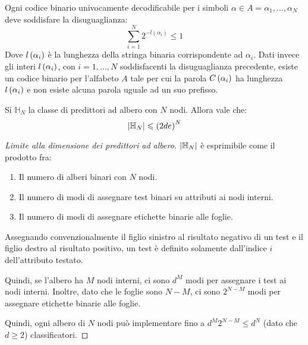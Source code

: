 \documentclass[\main/main.tex]{subfiles}
\begin{document}
\begin{multicols}{2}
\begin{observation}
    \end{observation}
    \begin{definition}
        Ogni codice binario univocamente decodificabile per i simboli \(\alpha \in A = \alpha_1, \ldots, \alpha_N\) deve soddisfare la disuguaglianza:
        \[
            \sum_{i=1}^{N} 2^{-l\left(\alpha_{i}\right)} \leq 1
        \]
        Dove \(l\left(\alpha_i\right)\) è la lunghezza della stringa binaria corrispondente ad \(\alpha_i\). Dati invece gli interi \(l\left(\alpha_i\right)\), con \(i = 1, \ldots, N\) soddisfacenti la disuguaglianza precedente, esiste un codice binario per l'alfabeto \(A\) tale per cui la parola \(C\left(\alpha_i\right)\) ha lunghezza \(l\left(\alpha_i\right)\) e non esiste alcuna parola uguale ad un suo prefisso.
    \end{definition}
    \begin{fact}
        Si \(\mathbb{H}_N\) la classe di predittori ad albero con \(N\) nodi. Allora vale che:
        \[
            \left\lvert\mathbb{H}_N\right\rvert \leqslant \left(2de\right)^N
        \]
    \end{fact}
    \begin{proof}[Limite alla dimensione dei predittori ad albero]
        \(\left\lvert\mathbb{H}_N\right\rvert\) è esprimibile come il prodotto fra: 
        \begin{enumerate}
            \item Il numero di alberi binari con \(N\) nodi.
            \item Il numero di modi di assegnare test binari su attributi ai nodi interni.
            \item Il numero di modi di assegnare etichette binarie alle foglie.
        \end{enumerate}
        Assegnando convenzionalmente il figlio sinistro al risultato negativo di un test e il figlio destro al risultato positivo, un test è definito solamente dall'indice \(i\) dell'attributo testato.
        
        Quindi, se l'albero ha \(M\) nodi interni, ci sono \(d^M\) modi per assegnare i test ai nodi interni. Inoltre, dato che le foglie sono \(N-M\), ci sono \(2^{N-M}\) modi per assegnare etichette binarie alle foglie.
        
        Quindi, ogni albero di \(N\) nodi può implementare fino a \(d^M2^{N-M} \leq d^N\) (dato che \(d \geq 2\)) classificatori.
        

\end{proof}
\end{multicols}
\end{document}
